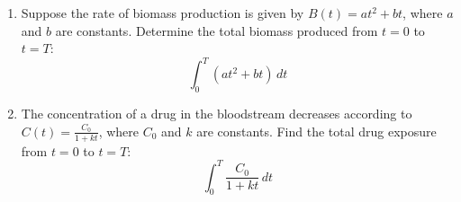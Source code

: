 \documentclass[11pt]{article}
\begin{document}
\begin{enumerate}
    \item Suppose the rate of biomass production is given by \( B(t) = a t^2 + b t \), where \( a \) and \( b \) are constants. Determine the total biomass produced from \( t = 0 \) to \( t = T \):
    \[
    \int_{0}^{T} \left( a t^2 + b t \right) \, dt
    \]
    
    \item The concentration of a drug in the bloodstream decreases according to \( C(t) = \frac{C_0}{1 + k t} \), where \( C_0 \) and \( k \) are constants. Find the total drug exposure from \( t = 0 \) to \( t = T \):
    \[
    \int_{0}^{T} \frac{C_0}{1 + k t} \, dt
    \]



    
   














\end{enumerate}
\end{document}
